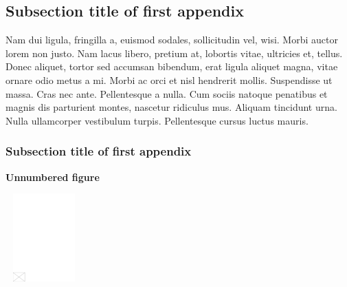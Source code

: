 \documentclass[CJCE,STIX2COL]{WileyNJD-v2}
\begin{document}
\subsection{Subsection title of first appendix\label{app1.1a}}

Nam dui ligula, fringilla a, euismod sodales, sollicitudin vel, wisi. Morbi auctor lorem non justo. Nam lacus libero,
pretium at, lobortis vitae, ultricies et, tellus. Donec aliquet, tortor sed accumsan bibendum, erat ligula aliquet magna,
vitae ornare odio metus a mi. Morbi ac orci et nisl hendrerit mollis. Suspendisse ut massa. Cras nec ante. Pellentesque
a nulla. Cum sociis natoque penatibus et magnis dis parturient montes, nascetur ridiculus mus. Aliquam tincidunt
urna. Nulla ullamcorper vestibulum turpis. Pellentesque cursus luctus mauris.

\subsubsection{Subsection title of first appendix\label{app1.1.1a}}

\noindent\textbf{Unnumbered figure}

\begin{center}
\includegraphics[width=7pc,height=8pc,draft]{empty}
\end{center}
\end{document}
